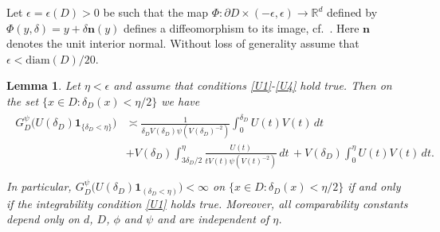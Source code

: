 \documentclass[12pt,a4paper,onecolumn]{article}
\newtheorem{lem}[thm]{Lemma}
\theoremstyle{definition}
\newcommand{\R}{\mathbb{R}}
\newcommand{\1}{\mathbf 1}
\newcommand{\de}{\delta_D}
\newcommand{\GDP}{G_D^\psi}
\numberwithin{equation}{section}
\begin{document}
    Let $\epsilon=\epsilon(D) >0$ be such that the map $\Phi:\partial D\times (-\epsilon, \epsilon)\to \R^d$ defined by $\Phi(y,\delta)=y+\delta\mathbf{n}(y)$ defines a diffeomorphism to its image, cf.~\cite[Remark 3.1]{AGCV19}. Here $\mathbf{n}$ denotes the unit interior normal.  Without loss of generality assume that $\epsilon<\mathrm{diam}(D)/20$.
	
	
	\begin{lem}\label{apx:l:GDFI close-to-bdry}
		Let $\eta<\epsilon$ and assume that  conditions \ref{U1}-\ref{U4} hold true. Then on the set $\{x\in D:\delta_D(x)<\eta/2\}$ we have 
		\begin{align}\label{eq:close-to-bdry}
			\begin{split}
				\GDP\big(U(\de)\1_{\{\de<\eta\}}\big)&\asymp \frac{1}{\de V(\de)\psi(V(\de)^{-2})}\int_0^{\de}U(t)V(t)\, dt\\
                &+ V(\de)\int_{3\de/2}^{\eta}\frac{U(t)}{tV(t)\psi(V(t)^{-2})}\, dt\, + V(\de)\int_0^{\eta}U(t)V(t)\, dt. \\
			\end{split}
		\end{align}
		In particular, $\GDP\big(U(\delta_D)\1_{(\delta_D<\eta)}\big)<\infty$ on $\{x\in D:\delta_D(x)<\eta/2\}$ if and only if  the integrability condition \ref{U1} holds true. Moreover, all comparability constants depend only on $d$, $D$, $\phi$ and $\psi$ and are independent of $\eta$.
	\end{lem}
\end{document}

